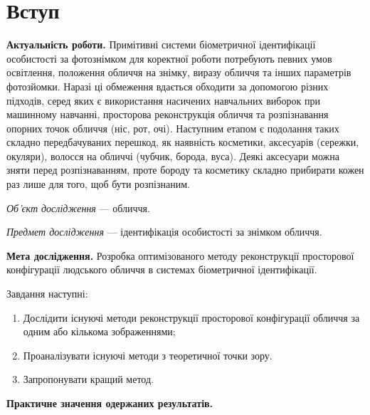 \chapter*{Вступ}

\textbf{Актуальність роботи.}
Примітивні системи біометричної ідентифікації особистості за фотознімком
для коректної роботи потребують певних умов
освітлення, положення обличчя на знімку, виразу обличчя
та інших параметрів фотозйомки.
Наразі ці обмеження вдається обходити за допомогою різних підходів,
серед яких є
використання насичених навчальних виборок при машинному навчанні,
просторова реконструкція обличчя та
розпізнавання опорних точок обличчя (ніс, рот, очі).
Наступним етапом є подолання таких складно передбачуваних перешкод,
як наявність косметики, аксесуарів (сережки, окуляри),
волосся на обличчі (чубчик, борода, вуса).
Деякі аксесуари можна зняти перед розпізнаванням,
проте бороду та косметику складно прибирати кожен раз лише для того,
щоб бути розпізнаним.

\textit{Об’єкт дослідження} --- обличчя.

\textit{Предмет дослідження} --- ідентифікація особистості за знімком обличчя.

\textbf{Мета дослідження.}
Розробка оптимізованого методу реконструкції просторової конфігурації
людського обличчя в системах біометричної ідентифікації.

Завдання наступні:
\begin{enumerate}
  \item
    Дослідити існуючі методи реконструкції просторової конфігурації обличчя
    за одним або кількома зображеннями;
  \item
    Проаналізувати існуючі методи з теоретичної точки зору.
  \item
    Запропонувати кращий метод.
\end{enumerate}

\textbf{Практичне значення одержаних результатів.}
